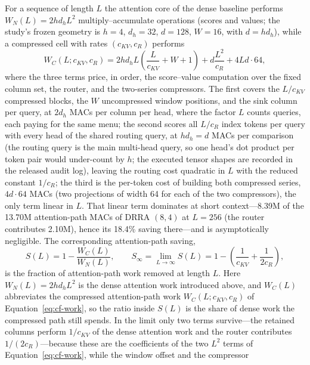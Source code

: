 For a sequence of length $L$
the attention core of the dense baseline performs $W_N(L) = 2 h d_h L^2$
multiply--accumulate operations (scores and values; the study's frozen
geometry is $h{=}4$, $d_h{=}32$, $d{=}128$, $W{=}16$, with $d = h d_h$),
while a compressed cell with rates $(c_{KV}, c_R)$ performs
\begin{equation}
\label{eq:cf-work}
W_C(L; c_{KV}, c_R)
= 2 h d_h L\!\left(\frac{L}{c_{KV}} + W + 1\right)
+ d \frac{L^{2}}{c_R}
+ 4 L d \cdot 64,
\end{equation}
where the three terms price, in order, the score--value computation over
the fixed column set, the router, and the two-series compressors. The
first covers the $L/c_{KV}$ compressed blocks, the $W$ uncompressed
window positions, and the sink column per query, at $2 d_h$ MACs per
column per head, where the factor $L$ counts queries, each paying for the
same menu; the second scores all $L/c_R$ index tokens per query with every
head of the shared routing query, at $h d_h = d$ MACs per comparison
(the routing query is the main multi-head query, so one head's dot product
per token pair would under-count by $h$; the executed tensor shapes are
recorded in the released audit log), leaving the routing cost quadratic in $L$
with the reduced constant $1/c_R$; the third is the per-token cost of
building both compressed series, $4d\cdot 64$ MACs (two projections of
width 64 for each of the two compressors), the only term
linear in $L$. That linear term dominates at short context---8.39M of
the 13.70M attention-path MACs of DRRA $(8,4)$ at $L{=}256$ (the router
contributes 2.10M), hence its
18.4\% saving there---and is asymptotically negligible.
The corresponding attention-path saving,
\begin{equation}
\label{eq:cf-savings}
S(L) = 1 - \frac{W_C(L)}{W_N(L)},
\qquad
S_\infty = \lim_{L \to \infty} S(L)
= 1 - \left(\frac{1}{c_{KV}} + \frac{1}{2 c_R}\right),
\end{equation}
is the fraction of attention-path work removed at length $L$. Here
$W_N(L) = 2 h d_h L^2$ is the dense attention work introduced above, and
$W_C(L)$ abbreviates the compressed attention-path work
$W_C(L; c_{KV}, c_R)$ of Equation~\ref{eq:cf-work}, so the ratio inside
$S(L)$ is the share of dense work the compressed path still spends. In
the limit only two terms survive---the retained columns perform
$1/c_{KV}$ of the dense attention work and the router contributes
$1/(2 c_R)$---because these are the coefficients of the two $L^2$ terms
of Equation~\ref{eq:cf-work}, while the window offset and the compressor
